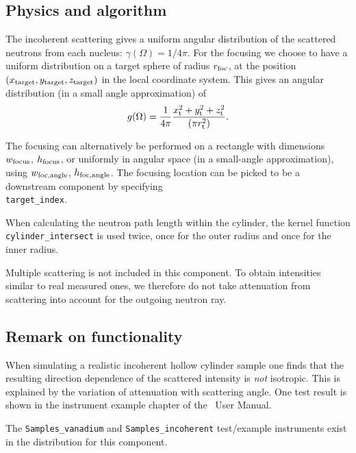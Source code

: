 \subsection{Physics and algorithm}

The incoherent scattering gives
a uniform angular distribution of the scattered
neutrons from each nucleus: $\gamma(\Omega) = 1/4\pi$.
For the focusing we choose to have a uniform distribution on
a target sphere of radius $r_{\rm foc}$, at the position
$(x_{\rm target},y_{\rm target},z_{\rm target})$
in the local coordinate system.
This gives an angular distribution (in a small angle approximation)
of
\begin{equation}
g(\Omega) = \frac{1}{4\pi}
  \frac{x_{\rm t}^2+y_{\rm t}^2+z_{\rm t}^2}{(\pi r_{\rm t}^2)}.
\end{equation}

The focusing can alternatively be performed on a rectangle with dimensions
$w_{\rm focus}$, $h_{\rm focus}$, or uniformly in angular space
(in a small-angle approximation),
using $w_{\rm foc, angle}$, $h_{\rm foc, angle}$.
The focusing location can be picked to be a downstream component by
specifying \\
\verb+target_index+.

When calculating the neutron path length within
the cylinder, the kernel function \\
\verb+cylinder_intersect+
is used twice, once for the outer radius and once
for the inner radius.

Multiple scattering is not included in this component. To obtain
intensities similar to real measured ones, we therefore do not
take attenuation from scattering into account for the outgoing
neutron ray.

\subsection{Remark on functionality}
When simulating a realistic incoherent hollow cylinder sample
one finds that  the resulting direction dependence
of the scattered intensity is {\em not} isotropic.
This is explained by the variation of attenuation with
scattering angle.
One test result is shown in the instrument example chapter of the \MCX\ User Manual.

The \verb+Samples_vanadium+ and \verb+Samples_incoherent+ test/example instruments exist in the distribution for this component.
